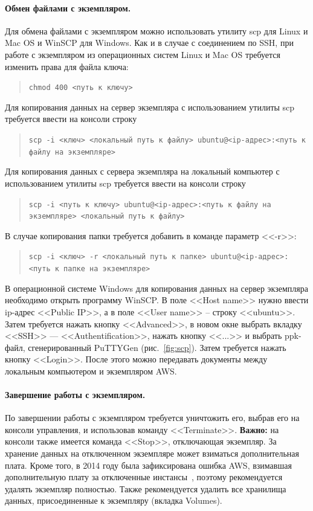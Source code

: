 \documentclass[12pt,notitlepage]{article}
\begin{document}
\paragraph{Обмен файлами с экземпляром.}
Для обмена файлами с экземпляром можно использовать утилиту scp для Linux и Mac OS и WinSCP для Windows. Как и в случае с соединением по SSH, при работе с экземпляром из операционных систем Linux и Mac OS требуется изменить права для файла ключа:
\begin{quote}
\tt{chmod 400 <путь к ключу>}
\end{quote}

Для копирования данных на сервер экземпляра с использованием утилиты scp требуется ввести на консоли строку
\begin{quote}
\tt{scp -i <ключ> <локальный путь к файлу> ubuntu@<ip-адрес>:<путь к файлу на экземпляре> }
\end{quote}

Для копирования данных с сервера экземпляра на локальный компьютер с использованием утилиты scp требуется ввести на консоли строку
\begin{quote}
\tt{scp -i <путь к ключу> ubuntu@<ip-адрес>:<путь к файлу на экземпляре> <локальный путь к файлу> }
\end{quote}
В случае копирования папки требуется добавить в команде параметр <<-r>>:
\begin{quote}
\tt{scp -i <ключ> -r <локальный путь к папке> ubuntu@<ip-адрес>:<путь к папке на экземпляре> }
\end{quote}

В операционной системе Windows для копирования данных на сервер экземпляра необходимо открыть программу WinSCP. В поле <<Host name>> нужно ввести ip-адрес <<Public IP>>, а в поле <<User name>> -- строку <<ubuntu>>. Затем требуется нажать кнопку <<Advanced>>, в новом окне выбрать вкладку
<<SSH>> --- <<Authentification>>, нажать кнопку <<...>> и выбрать ppk-файл, сгенерированный PuTTYGen (рис.~\ref{fig:scp}). Затем требуется нажать кнопку <<Login>>. После этого можно передавать документы между локальным компьютером и экземпляром AWS.

\paragraph{Завершение работы с экземпляром.}
По завершении работы с экземпляром требуется уничтожить его, выбрав его на консоли управления, и использовав команду <<Terminate>>. \textbf{Важно:} на консоли также имеется команда <<Stop>>, отключающая экземпляр. За хранение данных на отключенном экземпляре может взиматься дополнительная плата. Кроме того, в 2014 году была зафиксирована ошибка AWS, взимавшая дополнительную плату за отключенные инстансы~\cite{bug}, поэтому рекомендуется удалять экземпляр полностью. Также рекомендуется удалить все хранилища данных, присоединенные к экземпляру (вкладка Volumes). 
\end{document}
